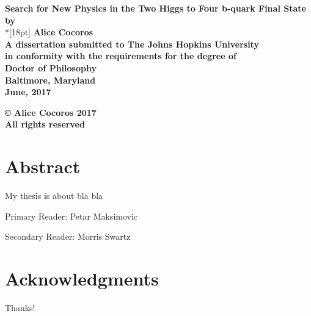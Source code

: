 \documentclass[12pt]{report}
\begin{document}
\newcommand{\bm}[1]{ \mbox{\boldmath $ #1 $} }
\newcommand{\bin}[2]{\left(\begin{array}{@{}c@{}} #1 \\ #2
             \end{array}\right) }
\renewcommand{\contentsname}{Table of Contents}
\baselineskip=24pt
 
\thispagestyle{empty}
\begin{center}
\vspace*{.25in}
{\bf\LARGE{ Search for New Physics in the Two Higgs to Four b-quark Final State }}\\ %
\vspace*{.75in}
{\bf by} \\*[18pt]
\vspace*{.2in}
{\bf Alice Cocoros}\\ %
\vspace*{1in}
{\bf A dissertation submitted to The Johns Hopkins University\\
in conformity with the requirements for the degree of\\
Doctor of Philosophy }\\
\vspace*{.75in}
{\bf Baltimore, Maryland} \\
{\bf June, 2017} \\     %
\vspace*{.5in}
\begin{small}
{\bf \copyright{ }Alice Cocoros 2017 } \\ %
{\bf All rights reserved}
\end{small}
\end{center}
\newpage 

\pagestyle{plain}
\setcounter{page}{2}
%
\chapter*{Abstract}
My thesis is about bla bla

\noindent Primary Reader: Petar Maksimovic

\noindent Secondary Reader: Morris Swartz

\chapter*{Acknowledgments}
Thanks!
%
%
\end{document}
